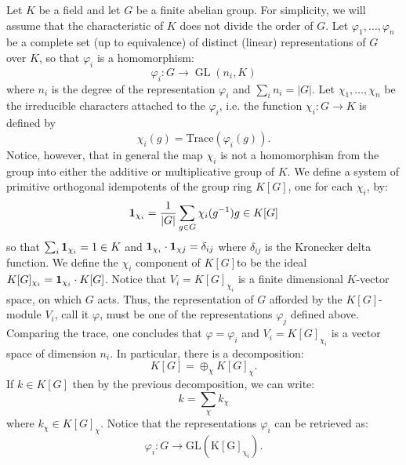 \documentclass[12pt]{article}
\theoremstyle{definition}
\begin{document}
Let $K$ be a field and let $G$ be a finite abelian group. For simplicity, we will assume that the characteristic of $K$ does not divide the order of $G$. Let $\varphi_1,\ldots, \varphi_n$ be a complete set (up to equivalence) of distinct  (linear) representations of $G$ over $K$, so that $\varphi_i$ is a homomorphism:
$$\varphi_i\colon G \longrightarrow \operatorname{GL}(n_i,K)$$
where $n_i$ is the degree of the representation $\varphi_i$ and $\sum_i n_i=|G|$. Let $\chi_1,\ldots,\chi_n$ be the irreducible characters attached to the $\varphi_i$, i.e. the function $\chi_i\colon G \to K$ is defined by
$$\chi_i(g)=\text{Trace}(\varphi_i(g)).$$
Notice, however, that in general the map $\chi_i$ is not a homomorphism from the group into either the additive or multiplicative group of $K$. We define a system of primitive orthogonal idempotents of the group ring $K[G]$, one for each $\chi_i$, by:
$${\bf 1}_{\chi_i}=\frac{1}{|G|}\sum_{g\in G} \chi_i(g^{-1})g\in K[G]$$
so that $\sum_{i}{\bf 1}_{\chi_i}=1\in K$ and ${\bf 1}_{\chi_i}\cdot {\bf 1}_{\chi j}=\delta_{ij}$ where $\delta_{ij}$ is the Kronecker delta function. We define the $\chi_i$ component of 
$K[G]$to be the ideal $K[G]_{\chi_i}={\bf 1}_{\chi_i}\cdot K[G]$. Notice that $V_i=K[G]_{\chi_i}$ is a finite dimensional $K$-vector space, on which $G$ acts. Thus, the representation of $G$ afforded by the $K[G]$-module $V_i$, call it $\varphi$, must be one of the representations $\varphi_j$ defined above. Comparing the trace, one concludes that $\varphi=\varphi_i$ and $V_i=K[G]_{\chi_i}$ is a vector space of dimension $n_i$. In particular, there is a decomposition:
$$K[G]=\oplus_\chi K[G]_\chi.$$
If $k\in K[G]$ then by the previous decomposition, we can write: 
$$k=\sum_\chi k_\chi$$
where $k_\chi \in K[G]_\chi$. Notice that the representations $\varphi_i$ can be retrieved as:
$$\varphi_i\colon G \longrightarrow \operatorname{GL(K[G]_{\chi_i})}.$$
\end{document}
